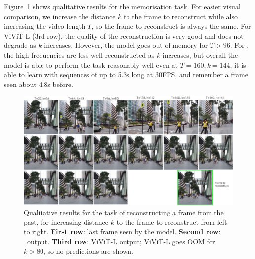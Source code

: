 Figure~\ref{fig:supmatmem} shows qualitative results for the memorisation task. For easier visual comparison, we increase the distance $k$ to the frame to reconstruct while also increasing the video length $T$, so the frame to reconstruct is always the same. For ViViT-L (3rd row), the quality of the reconstruction is very good and does not degrade as $k$ increases. However, the model goes out-of-memory for $T>96$. For \ssm, the high frequencies are less well reconstructed as $k$ increases, but overall the model is able to perform the task reasonably well even at $T=160,k=144$, \ie it is able to learn with sequences of up to 5.3s long at 30FPS, and remember a frame seen about 4.8s before.  

\begin{figure}[h]
  \centering
    \includegraphics[width=\linewidth]{img/longtaskmany.png}
    
  \caption{Qualitative results for the task of reconstructing a frame from the past, for increasing distance $k$ to the frame to reconstruct from left to right. \textbf{First row}: last frame seen by the model. \textbf{Second row}: \ssm\ output. \textbf{Third row}: ViViT-L output; ViViT-L goes OOM for $k>80$, so no predictions are shown.}
  \label{fig:supmatmem}
\end{figure}
